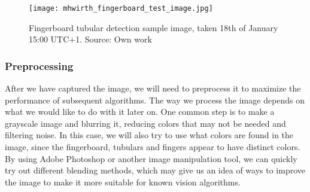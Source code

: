 \begin{figure}[ht]
    \centering
    \texttt{[image: mhwirth\_fingerboard\_test\_image.jpg]}
    \caption{Fingerboard tubular detection sample image, taken 18th of January 15:00 UTC+1. Source: Own work}
    \label{fig:mhwirth_fingerboard_test_image}
\end{figure}
\FloatBarrier


\subsubsection{Preprocessing}
After we have captured the image, we will need to preprocess it to maximize the performance of subsequent algorithms. The way we process the image depends on what we would like to do with it later on. One common step is to make a grayscale image and blurring it, reducing colors that may not be needed and filtering noise. In this case, we will also try to use what colors are found in the image, since the fingerboard, tubulars and fingers appear to have distinct colors. By using Adobe Photoshop or another image manipulation tool, we can quickly try out different blending methods, which may give us an idea of ways to improve the image to make it more suitable for known vision algorithms.

